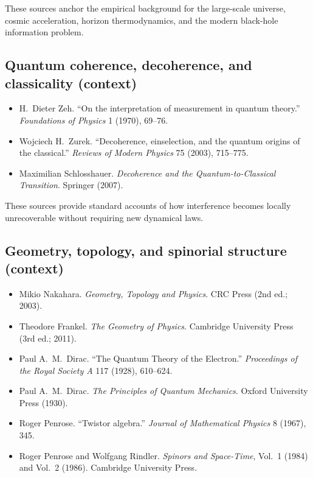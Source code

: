 \documentclass[11pt,twoside,openright]{book}
\begin{document}
\noindent
These sources anchor the empirical background for the large-scale universe,
cosmic acceleration,
horizon thermodynamics,
and the modern black-hole information problem.

\medskip

\subsection*{Quantum coherence, decoherence, and classicality (context)}

\begin{itemize}
  \setlength{\itemsep}{0.2em}
  \setlength{\parskip}{0pt}
  \item H.\ Dieter Zeh. ``On the interpretation of measurement in quantum theory.'' \emph{Foundations of Physics} 1 (1970), 69--76.
  \item Wojciech H.\ Zurek. ``Decoherence, einselection, and the quantum origins of the classical.'' \emph{Reviews of Modern Physics} 75 (2003), 715--775.
  \item Maximilian Schlosshauer. \emph{Decoherence and the Quantum-to-Classical Transition}. Springer (2007).
\end{itemize}

\noindent
These sources provide standard accounts of how interference becomes locally
unrecoverable without requiring new dynamical laws.

\medskip

\subsection*{Geometry, topology, and spinorial structure (context)}

\begin{itemize}
  \setlength{\itemsep}{0.2em}
  \setlength{\parskip}{0pt}
  \item Mikio Nakahara. \emph{Geometry, Topology and Physics}. CRC Press (2nd ed.; 2003).
  \item Theodore Frankel. \emph{The Geometry of Physics}. Cambridge University Press (3rd ed.; 2011).
  \item Paul A.\ M.\ Dirac. ``The Quantum Theory of the Electron.'' \emph{Proceedings of the Royal Society A} 117 (1928), 610--624.
  \item Paul A.\ M.\ Dirac. \emph{The Principles of Quantum Mechanics}. Oxford University Press (1930).
  \item Roger Penrose. ``Twistor algebra.'' \emph{Journal of Mathematical Physics} 8 (1967), 345.
  \item Roger Penrose and Wolfgang Rindler. \emph{Spinors and Space-Time}, Vol.\ 1 (1984) and Vol.\ 2 (1986). Cambridge University Press.
\end{itemize}
\end{document}
